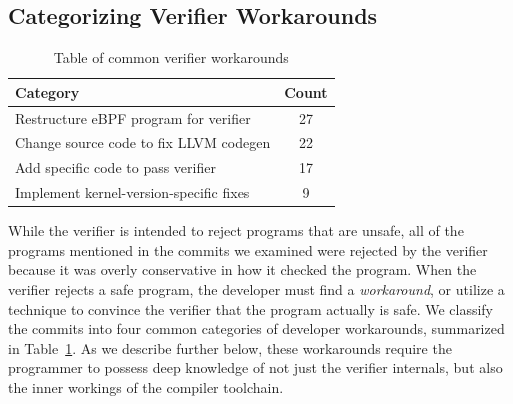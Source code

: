 \subsection{Categorizing Verifier Workarounds}

\begin{table}[t]
    \small
    \centering
    \begin{tabular}{lc}%
        \toprule
        \textbf{Category} & \textbf{Count} \\
        \midrule
        Restructure eBPF program for verifier & 27 \\           %
        Change source code to fix LLVM codegen & 22 \\          %
        Add specific code to pass verifier & 17 \\              %
        Implement kernel-version-specific fixes & 9 \\          %
        \bottomrule
    \end{tabular}
    \caption{Table of common verifier workarounds} %
    \vspace{-20pt}
    \label{fig:commit-table}
\end{table}

While the verifier is intended to reject programs that are unsafe, all
of the programs mentioned in the commits we examined were rejected by
the verifier because it was overly conservative in how it checked the
program.  When the verifier rejects a safe program, the developer must
find a {\em workaround}, or utilize a technique to convince the
verifier that the program actually is safe.  We classify the commits
into four common categories of developer workarounds, summarized in
Table~\ref{fig:commit-table}.  As we describe further below, these
workarounds require the programmer to possess deep knowledge of not
just the verifier internals, but also the inner workings of the
compiler toolchain.

